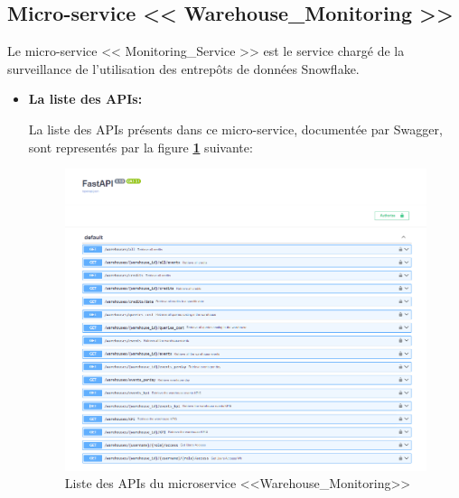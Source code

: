 \subsection{Micro-service << Warehouse\_Monitoring >>}
\par Le micro-service << Monitoring\_Service >> est le service chargé de la surveillance de l'utilisation des entrepôts de données Snowflake.
\begin{itemize}
    \item \textbf{La liste des APIs:}
        \par La liste des APIs présents dans ce micro-service, documentée par Swagger, sont representés par la figure \textbf{\ref{fig:apiWare}} suivante:
        \begin{figure}[H]
            \centering
            \includegraphics[width =1\linewidth]{img/captures/warehouses_apis.PNG}
            \caption{Liste des APIs du microservice <<Warehouse\_Monitoring>> }
                \label{fig:apiWare}
        \end{figure}


\end{itemize}

